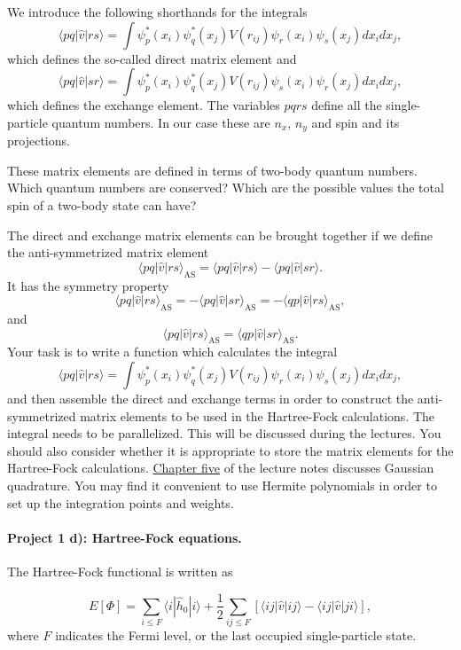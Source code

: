 \documentclass[%
oneside,                 %
final,                   %
10pt]{article}
\begin{document}
We introduce the following shorthands for the  integrals
\[
\langle pq|\hat{v}|rs\rangle =  \int \psi_{p}^*(x_i)\psi_{q}^*(x_j)V(r_{ij})\psi_{r}(x_i)\psi_{s}(x_j)
    dx_idx_j,
\]
which defines the so-called direct matrix element 
and
\[
\langle pq|\hat{v}|sr\rangle = \int \psi_{p}^*(x_i)\psi_{q}^*(x_j)
  V(r_{ij})\psi_{s}(x_i)\psi_{r}(x_j)
  dx_idx_j,  
\]
which defines the exchange element. The variables $pqrs$ define all the single-particle quantum numbers. In our case these are $n_x$, $n_y$ and spin and its projections.

These matrix elements are defined in terms of two-body quantum numbers. Which quantum numbers are conserved?
Which are  the possible values the total spin of a two-body state can have?

The direct and exchange matrix elements can be  brought together if we define the anti-symmetrized matrix element
\[
\langle pq|\hat{v}|rs\rangle_{\mathrm{AS}}= \langle pq|\hat{v}|rs\rangle-\langle pq|\hat{v}|sr\rangle.
\]
It has the symmetry property
\[
\langle pq|\hat{v}|rs\rangle_{\mathrm{AS}}= -\langle pq|\hat{v}|sr\rangle_{\mathrm{AS}}=-\langle qp|\hat{v}|rs\rangle_{\mathrm{AS}},
\]
and
\[
\langle pq|\hat{v}|rs\rangle_{\mathrm{AS}}= \langle qp|\hat{v}|sr\rangle_{\mathrm{AS}}.
\]
Your task is to write a function which calculates the integral 
\[
\langle pq|\hat{v}|rs\rangle =  \int \psi_{p}^*(x_i)\psi_{q}^*(x_j)V(r_{ij})\psi_{r}(x_i)\psi_{s}(x_j)
    dx_idx_j,
\]
and then assemble the direct and exchange terms in order to construct the anti-symmetrized matrix elements to be used in the Hartree-Fock calculations. The integral needs to be parallelized. This will be discussed during the lectures. You should also consider whether it is appropriate to store the matrix elements for the Hartree-Fock calculations.  \href{{https://github.com/CompPhysics/ComputationalPhysics2/blob/gh-pages/doc/Literature/lectures2015.pdf}}{Chapter five} of the lecture notes discusses Gaussian quadrature. You may find it convenient to use Hermite   polynomials in order to set up the integration points and weights. 


\paragraph{Project 1 d): Hartree-Fock equations.}
The Hartree-Fock functional is written as

\begin{equation*}
  E[\Phi] 
  = \sum_{i\le F} \langle i | \hat{h}_0 | i\rangle+ \frac{1}{2}\sum_{ij \le F}\left[\langle ij |\hat{v}|ij\rangle-\langle ij |\hat{v}|ji\rangle\right],
\end{equation*}
where $F$ indicates the Fermi level, or the last occupied single-particle state.
\end{document}
